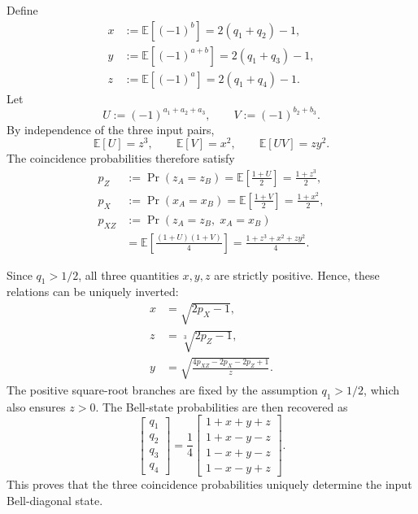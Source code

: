 Define
\begin{equation}
\begin{aligned}
x&:=\mathbb E[(-1)^b]=2(q_1+q_2)-1,\\
y&:=\mathbb E[(-1)^{a+b}]=2(q_1+q_3)-1,\\
z&:=\mathbb E[(-1)^a]=2(q_1+q_4)-1.
\end{aligned}
\label{eq:double-selection-correlations}
\end{equation}
Let
\[
U:=(-1)^{a_1+a_2+a_3},
\qquad
V:=(-1)^{b_2+b_3}.
\]
By independence of the three input pairs,
\begin{equation}
\mathbb E[U]=z^3,
\qquad
\mathbb E[V]=x^2,
\qquad
\mathbb E[UV]=zy^2.
\end{equation}
The coincidence probabilities therefore satisfy
\begin{equation}
\begin{aligned}
p_Z
&:=
\Pr(z_A=z_B)
=
\mathbb E\left[\frac{1+U}{2}\right]
=
\frac{1+z^3}{2},\\
p_X
&:=
\Pr(x_A=x_B)
=
\mathbb E\left[\frac{1+V}{2}\right]
=
\frac{1+x^2}{2},\\
p_{XZ}
&:=
\Pr(z_A=z_B,\;x_A=x_B)\\
&=
\mathbb E\left[\frac{(1+U)(1+V)}{4}\right]
=
\frac{1+z^3+x^2+zy^2}{4}.
\end{aligned}
\label{eq:double-selection-probabilities}
\end{equation}

Since \(q_1>1/2\), all three quantities \(x,y,z\) are strictly
positive. Hence, these relations can be uniquely inverted:
\begin{equation}
\begin{aligned}
x&=\sqrt{2p_X-1},\\
z&=\sqrt[3]{2p_Z-1},\\
y&=
\sqrt{
\frac{4p_{XZ}-2p_X-2p_Z+1}{z}
}.
\end{aligned}
\label{eq:double-selection-inversion}
\end{equation}
The positive square-root branches are fixed by the assumption
\(q_1>1/2\), which also ensures \(z>0\).
The Bell-state probabilities are then recovered as
\begin{equation}
\begin{bmatrix}
q_1\\q_2\\q_3\\q_4
\end{bmatrix}
=
\frac{1}{4}
\begin{bmatrix}
1+x+y+z\\
1+x-y-z\\
1-x+y-z\\
1-x-y+z
\end{bmatrix}.
\label{eq:double-selection-state-reconstruction}
\end{equation}
This proves that the three coincidence probabilities uniquely
determine the input Bell-diagonal state.

